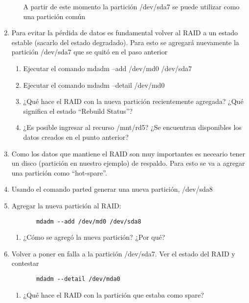 \begin{enumerate}
\begin{enumerate}
    A partir de este momento la partición /dev/sda7 se puede utilizar como una partición común	 		 	
 \end{enumerate}
 \item Para evitar la pérdida de datos es fundamental volver al RAID a un estado estable (sacarlo del estado degradado). 
    Para esto se agregará nuevamente la partición /dev/sda7 que se quitó en el paso anterior
  \begin{enumerate}
   \item Ejecutar el comando mdadm --add /dev/md0 /dev/sda7
   \item Ejecutar el comando mdadm –detail /dev/md0
   \item ¿Qué hace el RAID con la nueva partición recientemente agregada? ¿Qué significa el estado ``Rebuild Status''?
   \item ¿Es posible ingresar al recurso /mnt/rd5? ¿Se encuentran disponibles los datos creados en el punto anterior?
  \end{enumerate}
  
 \item Como los datos que mantiene el RAID son muy importantes es neceario tener un disco (partición en nuestro ejemplo) 
   de respaldo. Para esto se va a agregar una partición como ``hot-spare''. 
 \item Usando el comando parted generar una nueva partición, /dev/sda8
 \item Agregar la nueva partición al RAID:
   \begin{verbatim}
       mdadm --add /dev/md0 /dev/sda8
   \end{verbatim}
   \begin{enumerate}
     \item ¿Cómo se agregó la nueva partición? ¿Por qué?
   \end{enumerate}           
 \item Volver a poner en falla a la partición /dev/sda7. Ver el estado del RAID y contestar   
   \begin{verbatim}
       mdadm --detail /dev/mda0 
   \end{verbatim}
  \begin{enumerate}
   \item ¿Qué hace el RAID con la partición que estaba como spare?
  \end{enumerate} 


\end{enumerate}
